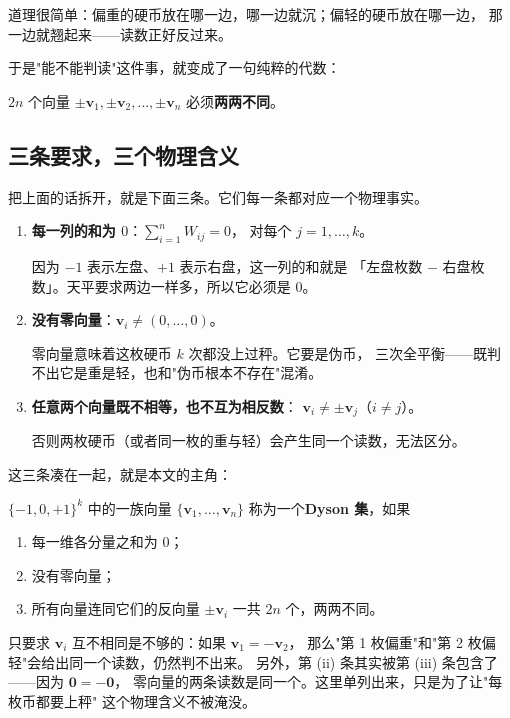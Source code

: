\documentclass[UTF8,11pt,fontset=macnew]{ctexart}
\newcommand{\vv}{\mathbf{v}}
\begin{document}
道理很简单：偏重的硬币放在哪一边，哪一边就沉；偏轻的硬币放在哪一边，
那一边就翘起来——读数正好反过来。

于是"能不能判读"这件事，就变成了一句纯粹的代数：

\begin{keybox}[判读条件]
$2n$ 个向量 $\pm\vv_1,\pm\vv_2,\dots,\pm\vv_n$ 必须\textbf{两两不同}。
\end{keybox}

\subsection{三条要求，三个物理含义}

把上面的话拆开，就是下面三条。它们每一条都对应一个物理事实。

\begin{enumerate}
  \item \textbf{每一列的和为 $0$}：$\displaystyle\sum_{i=1}^{n}W_{ij}=0$，
        对每个 $j=1,\dots,k$。
        
        因为 $-1$ 表示左盘、$+1$ 表示右盘，这一列的和就是
        「左盘枚数 $-$ 右盘枚数」。天平要求两边一样多，所以它必须是 $0$。
  \item \textbf{没有零向量}：$\vv_i \neq (0,\dots,0)$。
        
        零向量意味着这枚硬币 $k$ 次都没上过秤。它要是伪币，
        三次全平衡——既判不出它是重是轻，也和"伪币根本不存在"混淆。
  \item \textbf{任意两个向量既不相等，也不互为相反数}：
        $\vv_i \neq \pm\vv_j$（$i\neq j$）。
        
        否则两枚硬币（或者同一枚的重与轻）会产生同一个读数，无法区分。
\end{enumerate}

这三条凑在一起，就是本文的主角：

\begin{keybox}[Dyson 集]
$\{-1,0,+1\}^k$ 中的一族向量 $\{\vv_1,\dots,\vv_n\}$ 称为一个\textbf{Dyson 集}，如果

\begin{enumerate}[label=(\roman*),leftmargin=2.2em]
  \item 每一维各分量之和为 $0$；
  \item 没有零向量；
  \item 所有向量连同它们的反向量 $\pm\vv_i$ 一共 $2n$ 个，两两不同。
\end{enumerate}
\end{keybox}

\begin{warnbox}
只要求 $\vv_i$ 互不相同是不够的：如果 $\vv_1=-\vv_2$，
那么"第 1 枚偏重"和"第 2 枚偏轻"会给出同一个读数，仍然判不出来。
另外，第 (ii) 条其实被第 (iii) 条包含了——因为 $\mathbf{0}=-\mathbf{0}$，
零向量的两条读数是同一个。这里单列出来，只是为了让"每枚币都要上秤"
这个物理含义不被淹没。
\end{warnbox}
\end{document}
